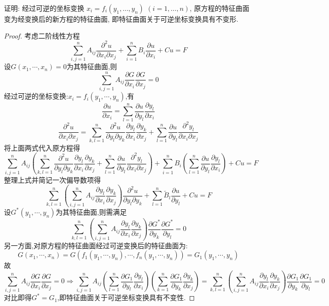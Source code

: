 \begin{exercise}
  证明: 经过可逆的坐标变换 $x_i = f_i(y_1, \ldots, y_n)$ $(i=1, \ldots, n)$,
  原方程的特征曲面变为经变换后的新方程的特征曲面,
  即特征曲面关于可逆坐标变换具有不变形.
\end{exercise}

\begin{proof}
  考虑二阶线性方程
  \[\sum_{i,j=1}^nA_{ij}\frac{\partial^2u}{\partial x_i\partial x_j}+\sum_{i=1}^nB_i\frac{\partial u}{\partial x_i}+Cu=F\]
  设$G(x_1,\cdots,x_n)=0$为其特征曲面,则
  \[\sum_{i,j=1}^nA_{ij}\frac{\partial G}{\partial x_i}\frac{\partial G}{\partial x_j}=0\]
  经过可逆的坐标变换:$x_i=f_i(y_1,\cdots,y_n)$,有
  \[\frac{\partial u}{\partial x_i}=\sum_{l=1}^n\frac{\partial u}{\partial y_l}\frac{\partial y_l}{\partial x_i}\]
  \[\frac{\partial^2u}{\partial x_i\partial x_j}=\sum_{k,l=1}^n\frac{\partial^2u}{\partial y_l\partial y_k}\frac{\partial y_l}{\partial x_i}\frac{\partial y_k}{\partial x_j}+\sum_{l=1}^n\frac{\partial u}{\partial y_l}\frac{\partial^2y_l}{\partial x_i\partial x_j}\]
  将上面两式代入原方程得
  \[\sum_{i,j=1}^nA_{ij}\left(\sum_{k,l=1}^n\frac{\partial^2u}{\partial y_l\partial y_k}\frac{\partial y_l}{\partial x_i}\frac{\partial y_k}{\partial x_j}+\sum_{l=1}^n\frac{\partial u}{\partial y_l}\frac{\partial^2y_l}{\partial x_i\partial x_j}\right)+\sum_{i=1}^nB_i\left(\sum_{l=1}^n\frac{\partial u}{\partial y_l}\frac{\partial y_l}{\partial x_i}\right)+Cu=F\]
  整理上式并简记一次偏导数项得
  \[\sum_{k,l=1}^n\left(\sum_{i,j=1}^nA_{ij}\frac{\partial y_l}{\partial x_i}\frac{\partial y_k}{\partial x_j}\right)\frac{\partial^2u}{\partial y_l\partial y_k}+\sum_{l=1}^n\widetilde{B}_l\frac{\partial u}{\partial y_l}+Cu=F\]
  设$G^*(y_1,\cdots,y_n)$为其特征曲面,则需满足
  \[\sum_{k,l=1}^n\left(\sum_{i,j=1}^nA_{ij}\frac{\partial y_l}{\partial x_i}\frac{\partial y_k}{\partial x_j}\right)\frac{\partial G^*}{\partial y_k}\frac{\partial G^*}{\partial y_l}=0\]
  另一方面,对原方程的特征曲面经过可逆变换后的特征曲面为:
  \[G(x_1,\cdots,x_n)=G(f_1(y_1,\cdots,y_n),\cdots,f_n(y_1,\cdots,y_n))=G_1(y_1,\cdots,y_n)\]
  故
  \[\sum_{i,j=1}^nA_{ij}\frac{\partial G}{\partial x_i}\frac{\partial G}{\partial x_j}=0\Rightarrow\sum_{i,j=1}^nA_{ij}\left(\sum_{l=1}^n\frac{\partial G_1}{\partial y_l}\frac{\partial y_l}{\partial x_i}\right)\left(\sum_{k=1}^n\frac{\partial G_1}{\partial y_k}\frac{\partial y_k}{\partial x_j}\right)=\sum_{k,l=1}^n\left(\sum_{i,j=1}^nA_{ij}\frac{\partial y_l}{\partial x_i}\frac{\partial y_k}{\partial x_j}\right)\frac{\partial G_1}{\partial y_k}\frac{\partial G_1}{\partial y_l}=0\]
  对比即得$G^*=G_1$,即特征曲面关于可逆坐标变换具有不变性.
\end{proof}



